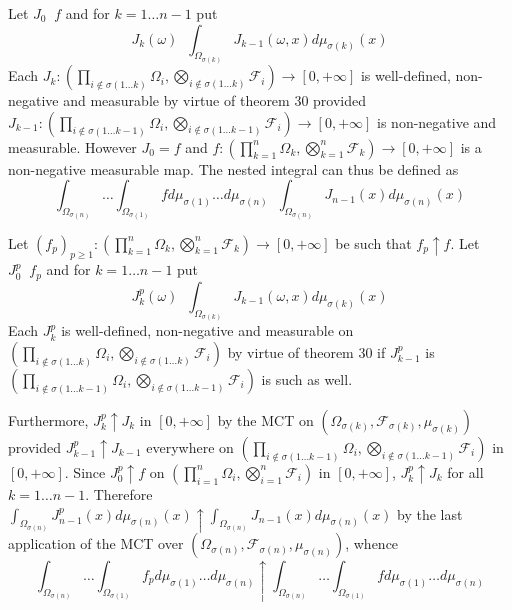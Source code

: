 \documentclass[a4paper]{article}
\newcommand{\clo}[1]{\left [ #1 \right ]}
\newcommand{\brac}[1]{\left ( #1 \right )}
\newcommand{\Zinf}{\clo{ 0, +\infty }}
\newcommand{\Fcal}{\mathcal{F}}
\newcommand{\defn}{\mathop{\overset{\Delta}{=}}\nolimits}
\begin{document}
Let $J_0 \defn f$ and for $k=1\ldots n-1$ put \[J_k\brac{\omega} \defn \int_{\Omega_{\sigma\brac{k}}} J_{k-1}\brac{\omega, x} d\mu_{\sigma\brac{k}}\brac{x}\] Each $J_k:\brac{ \prod_{i\notin \sigma\brac{1\ldots k}}\Omega_i, \bigotimes_{i\notin \sigma\brac{1\ldots k}}\Fcal_i }\to\Zinf$ is well-defined, non-negative and measurable by virtue of theorem 30 provided $J_{k-1}:\brac{ \prod_{i\notin \sigma\brac{1\ldots k-1}}\Omega_i, \bigotimes_{i\notin \sigma\brac{1\ldots k-1}}\Fcal_i }\to\Zinf$ is non-negative and measurable. However $J_0 = f$ and $f:\brac{\prod_{k=1}^n \Omega_k, \bigotimes_{k=1}^n \Fcal_k } \to \Zinf$ is a non-negative measurable map. The nested integral can thus be defined as \[\int_{\Omega_{\sigma\brac{ n } } } \ldots  \int_{\Omega_{\sigma\brac{ 1 } } } f d\mu_{\sigma\brac{ 1 } } \ldots d\mu_{\sigma\brac{ n } } \defn \int_{\Omega_{\sigma\brac{n}}} J_{n-1}\brac{x} d\mu_{\sigma\brac{n}}\brac{x}\]

Let $\brac{f_p}_{p\geq 1}:\brac{\prod_{k=1}^n \Omega_k, \bigotimes_{k=1}^n \Fcal_k}\to\Zinf$ be such that $f_p\uparrow f$. Let $J^p_0 \defn f_p$ and for $k=1\ldots n-1$ put \[J^p_k\brac{\omega} \defn \int_{\Omega_{\sigma\brac{k}}} J_{k-1}\brac{\omega, x} d\mu_{\sigma\brac{k}}\brac{x}\] Each $J^p_k$ is well-defined, non-negative and measurable on $\brac{ \prod_{i\notin \sigma\brac{1\ldots k}}\Omega_i, \bigotimes_{i\notin \sigma\brac{1\ldots k}}\Fcal_i }$ by virtue of theorem 30 if $J^p_{k-1}$ is $\brac{ \prod_{i\notin \sigma\brac{1\ldots k-1}}\Omega_i, \bigotimes_{i\notin \sigma\brac{1\ldots k-1}}\Fcal_i }$ is such as well.

Furthermore, $J^p_k\uparrow J_k$ in $\Zinf$ by the MCT on $\brac{\Omega_{\sigma\brac{k}}, \Fcal_{\sigma\brac{k}}, \mu_{\sigma\brac{k}}}$ provided $J^p_{k-1}\uparrow J_{k-1}$ everywhere on $\brac{ \prod_{i\notin \sigma\brac{1\ldots k-1}}\Omega_i, \bigotimes_{i\notin \sigma\brac{1\ldots k-1}}\Fcal_i }$ in $\Zinf$. Since $J^p_0\uparrow f$ on $\brac{ \prod_{i=1}^n\Omega_i, \bigotimes_{i=1}^n\Fcal_i}$ in $\Zinf$, $J^p_k\uparrow J_k$ for all $k=1\ldots n-1$. Therefore $\int_{\Omega_{\sigma\brac{n}}} J^p_{n-1}\brac{x} d\mu_{\sigma\brac{n}}\brac{x} \uparrow \int_{\Omega_{\sigma\brac{n}}} J_{n-1}\brac{x} d\mu_{\sigma\brac{n}}\brac{x}$ by the last application of the MCT over $\brac{\Omega_{\sigma\brac{n}}, \Fcal_{\sigma\brac{n}}, \mu_{\sigma\brac{n}}}$, whence \[\int_{\Omega_{\sigma\brac{ n } } } \ldots  \int_{\Omega_{\sigma\brac{ 1 } } } f_p d\mu_{\sigma\brac{ 1 } } \ldots d\mu_{\sigma\brac{ n } } \uparrow \int_{\Omega_{\sigma\brac{ n } } } \ldots \int_{\Omega_{\sigma\brac{ 1 } } } f d\mu_{\sigma\brac{ 1 } } \ldots d\mu_{\sigma\brac{ n } }\]
\end{document}
